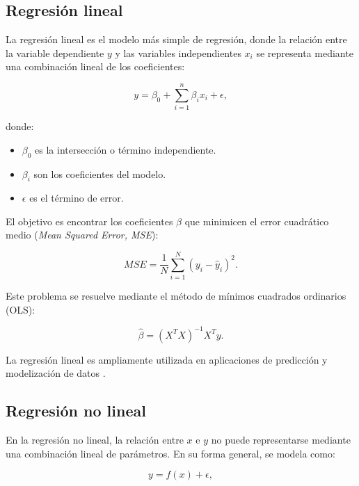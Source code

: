 \begin{itemize}
		\subsection{Regresión lineal}
		
		La regresión lineal es el modelo más simple de regresión, donde la relación entre la variable dependiente \( y \) y las variables independientes \( x_i \) se representa mediante una combinación lineal de los coeficientes:
		
		\begin{equation}
			y = \beta_0 + \sum_{i=1}^{n} \beta_i x_i + \epsilon,
		\end{equation}
		
		donde:
		\begin{itemize}
			\item \( \beta_0 \) es la intersección o término independiente.
			\item \( \beta_i \) son los coeficientes del modelo.
			\item \( \epsilon \) es el término de error.
		\end{itemize}
		
		El objetivo es encontrar los coeficientes \( \beta \) que minimicen el error cuadrático medio (\textit{Mean Squared Error, MSE}):
		
		\begin{equation}
			MSE = \frac{1}{N} \sum_{i=1}^{N} (y_i - \hat{y}_i)^2.
		\end{equation}
		
		Este problema se resuelve mediante el método de mínimos cuadrados ordinarios (OLS):
		
		\begin{equation}
			\hat{\beta} = (X^T X)^{-1} X^T y.
		\end{equation}
		
		La regresión lineal es ampliamente utilizada en aplicaciones de predicción y modelización de datos \cite{hastie2009elements}.
		
		\subsection{Regresión no lineal}
		
		En la regresión no lineal, la relación entre \( x \) e \( y \) no puede representarse mediante una combinación lineal de parámetros. En su forma general, se modela como:
		
		\begin{equation}
			y = f(x) + \epsilon,
		\end{equation}
		

\end{itemize}
